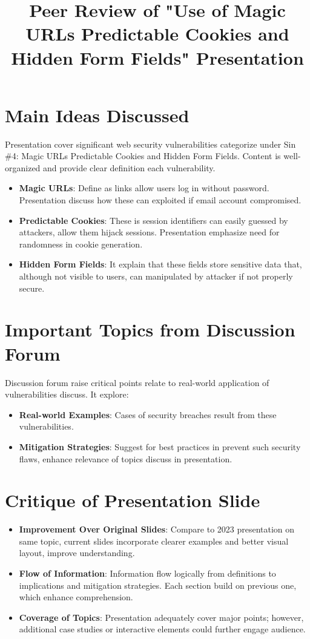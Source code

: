 \documentclass{article}
\title{Peer Review of "Use of Magic URLs Predictable Cookies and Hidden Form Fields" Presentation}
\author{}
\date{}
\begin{document}
\maketitle

\section{Main Ideas Discussed}
Presentation cover significant web security vulnerabilities categorize under Sin \#4: Magic URLs Predictable Cookies and Hidden Form Fields. Content is well-organized and provide clear definition each vulnerability.

\begin{itemize}
    \item \textbf{Magic URLs}: Define as links allow users log in without password. Presentation discuss how these can exploited if email account compromised.
    \item \textbf{Predictable Cookies}: These is session identifiers can easily guessed by attackers, allow them hijack sessions. Presentation emphasize need for randomness in cookie generation.
    \item \textbf{Hidden Form Fields}: It explain that these fields store sensitive data that, although not visible to users, can manipulated by attacker if not properly secure.
\end{itemize}

\section{Important Topics from Discussion Forum}
Discussion forum raise critical points relate to real-world application of vulnerabilities discuss. It explore:
\begin{itemize}
    \item \textbf{Real-world Examples}: Cases of security breaches result from these vulnerabilities.
    \item \textbf{Mitigation Strategies}: Suggest for best practices in prevent such security flaws, enhance relevance of topics discuss in presentation.
\end{itemize}

\section{Critique of Presentation Slide}
\begin{itemize}
    \item \textbf{Improvement Over Original Slides}: Compare to 2023 presentation on same topic, current slides incorporate clearer examples and better visual layout, improve understanding.
    \item \textbf{Flow of Information}: Information flow logically from definitions to implications and mitigation strategies. Each section build on previous one, which enhance comprehension.
    \item \textbf{Coverage of Topics}: Presentation adequately cover major points; however, additional case studies or interactive elements could further engage audience.
\end{itemize}
\end{document}

